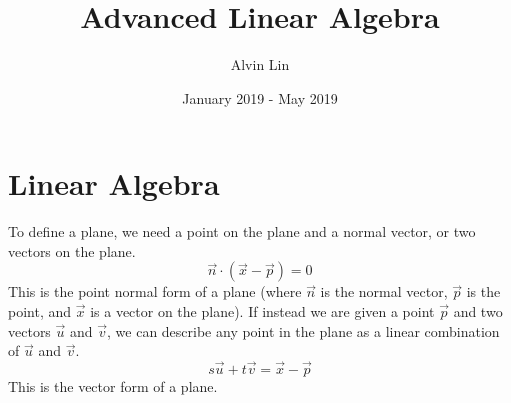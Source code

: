 \documentclass{math}
\title{Advanced Linear Algebra}
\author{Alvin Lin}
\date{January 2019 - May 2019}
\begin{document}
\maketitle

\section*{Linear Algebra}
To define a plane, we need a point on the plane and a normal vector, or two
vectors on the plane.
\[ \vec{n}\cdot(\vec{x}-\vec{p}) = 0 \]
This is the point normal form of a plane (where \( \vec{n} \) is the normal
vector, \( \vec{p} \) is the point, and \( \vec{x} \) is a vector on the plane).
If instead we are given a point \( \vec{p} \) and two vectors \( \vec{u} \) and
\( \vec{v} \), we can describe any point in the plane as a linear combination of
\( \vec{u} \) and \( \vec{v} \).
\[ s\vec{u}+t\vec{v} = \vec{x}-\vec{p} \]
This is the vector form of a plane.
\end{document}
